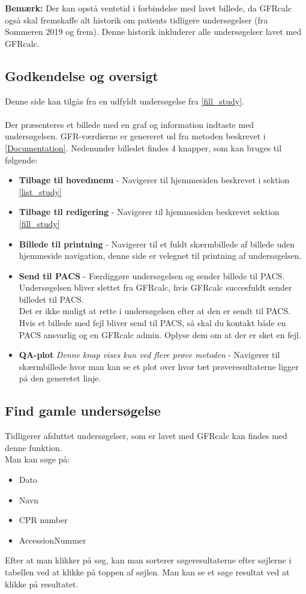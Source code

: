 \documentclass{article}
\begin{document}
\textbf{Bemærk:} Der kan opstå ventetid i forbindelse med lavet billede, da GFRcalc også skal fremskaffe alt historik om patients tidligere undersøgelser (fra Sommeren 2019 og frem). Denne historik inkluderer alle undersøgelser lavet med GFRcalc.  
\subsection{Godkendelse og oversigt}\label{present_study}
Denne side kan tilgås fra en udfyldt undersøgelse fra \ref{fill_study}.\\\\
Der præsenteres et billede med en graf og information indtaste med undersøgelsen. GFR-værdierne er genereret ud fra metoden beskrevet i \ref{Documentation}.  Nedenunder billedet findes 4 knapper, som kan bruges til følgende:
\begin{itemize}
	\item \textbf{Tilbage til hovedmenu} - Navigerer til hjemmesiden beskrevet i sektion \ref{list_study}
	\item \textbf{Tilbage til redigering} - Navigerer til hjemmesiden beskrevet sektion \ref{fill_study}
	\item \textbf{Billede til printning} - Navigerer til et fuldt skærmbillede af billede uden hjemmeside navigation, denne side er velegnet til printning af undersøgelsen.
	\item \textbf{Send til PACS} - Færdiggøre undersøgelsen og sender billede til PACS. Undersøgelsen bliver slettet fra GFRcalc, hvis GFRcalc succesfuldt sender billedet til PACS.\\ Det er ikke muligt at rette i undersøgelsen efter at den er sendt til PACS.\\
	Hvis et billede med fejl bliver send til PACS, så skal du kontakt både en PACS ansvarlig og en GFRcalc admin. Oplyse dem om at der er sket en fejl.   
	\item \textbf{QA-plot} \textit{Denne knap vises kun ved flere prøve metoden} - Navigerer til skærmbillede hvor man kan se et plot over hvor tæt prøveresultaterne ligger på den generetet linje.
\end{itemize}

\subsection{Find gamle undersøgelse}\label{search}
Tidligerer afsluttet undersøgelser, som er lavet med GFRcalc kan findes med denne funktion.\\
Man kan søge på:
\begin{itemize}
	\item Dato
	\item Navn
	\item CPR number
	\item AccessionNummer 
\end{itemize}
Efter at man klikker på søg, kan man sorterer søgeresultaterne efter søjlerne i tabellen ved at klikke på toppen af søjlen. Man kan se et søge resultat ved at klikke på resultatet.\\
\end{document}
